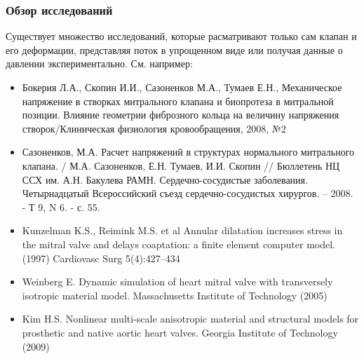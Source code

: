 \documentclass[14pt]{beamer}
\begin{document}
\begin{frame}
\frametitle{Обзор исследований}
    Существует множество исследований, которые расматривают только сам клапан и его деформации,
    представляя поток в упрощенном виде или получая данные о давлении экспериментально. См. например:\\
    \par
    {\tiny
        \begin{itemize}
            \item[\MVRightarrow] Бокерия Л.А., Скопин И.И., Сазоненков М.А., Тумаев Е.Н., Механическое напряжение в створках митрального клапана и биопротеза в митральной позиции. Влияние геометрии фиброзного кольца на величину напряжения створок/Клиническая физиология кровообращения, 2008, №2
            \item[\MVRightarrow] Сазоненков, М.А. Расчет напряжений в структурах нормального митрального клапана. / М.А. Сазоненков, Е.Н. Тумаев, И.И. Скопин // Бюллетень НЦ ССХ им. А.Н. Бакулева РАМН. Сердечно-сосудистые заболевания. Четырнадцатый Всероссийский съезд сердечно-сосудистых хирургов. – 2008. - Т 9, N 6. - с. 55.
            \item[\MVRightarrow] Kunzelman K.S., Reimink M.S. et al  Annular dilatation increases stress in the mitral valve and delays coaptation: a finite element computer model. (1997) Cardiovasc Surg 5(4):427–434
            \item[\MVRightarrow] Weinberg E. Dynamic simulation of heart mitral valve with transversely isotropic material model. Massachusetts Institute of Technology (2005)
            \item[\MVRightarrow] Kim H.S. Nonlinear multi-scale anisotropic material and structural models for prosthetic and native aortic heart valves. Georgia Institute of Technology (2009)
        \end{itemize}
    }
\end{frame}
\end{document}

